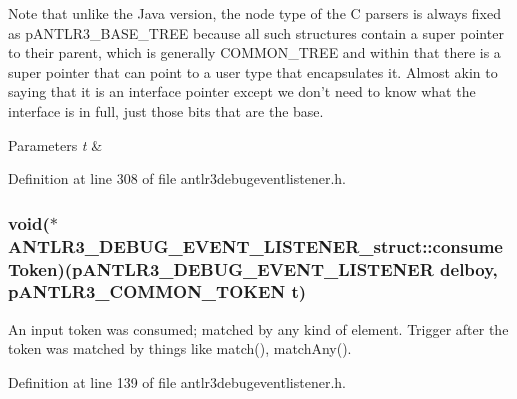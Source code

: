 Note that unlike the Java version, the node type of the C parsers is always fixed as p\-A\-N\-T\-L\-R3\-\_\-\-B\-A\-S\-E\-\_\-\-T\-R\-E\-E because all such structures contain a super pointer to their parent, which is generally C\-O\-M\-M\-O\-N\-\_\-\-T\-R\-E\-E and within that there is a super pointer that can point to a user type that encapsulates it. Almost akin to saying that it is an interface pointer except we don't need to know what the interface is in full, just those bits that are the base. 
\begin{DoxyParams}{Parameters}
{\em t} & \\
\hline
\end{DoxyParams}


Definition at line 308 of file antlr3debugeventlistener.\-h.

\hypertarget{struct_a_n_t_l_r3___d_e_b_u_g___e_v_e_n_t___l_i_s_t_e_n_e_r__struct_aa102c05452b09dc31bde71db7d1cf27b}{
\subsubsection[{consume\-Token}]{\setlength{\rightskip}{0pt plus 5cm}void($\ast$ A\-N\-T\-L\-R3\-\_\-\-D\-E\-B\-U\-G\-\_\-\-E\-V\-E\-N\-T\-\_\-\-L\-I\-S\-T\-E\-N\-E\-R\-\_\-struct\-::consume\-Token)({\bf p\-A\-N\-T\-L\-R3\-\_\-\-D\-E\-B\-U\-G\-\_\-\-E\-V\-E\-N\-T\-\_\-\-L\-I\-S\-T\-E\-N\-E\-R} delboy, {\bf p\-A\-N\-T\-L\-R3\-\_\-\-C\-O\-M\-M\-O\-N\-\_\-\-T\-O\-K\-E\-N} {\bf t})}}\label{struct_a_n_t_l_r3___d_e_b_u_g___e_v_e_n_t___l_i_s_t_e_n_e_r__struct_aa102c05452b09dc31bde71db7d1cf27b}
An input token was consumed; matched by any kind of element. Trigger after the token was matched by things like match(), match\-Any(). 

Definition at line 139 of file antlr3debugeventlistener.\-h.

